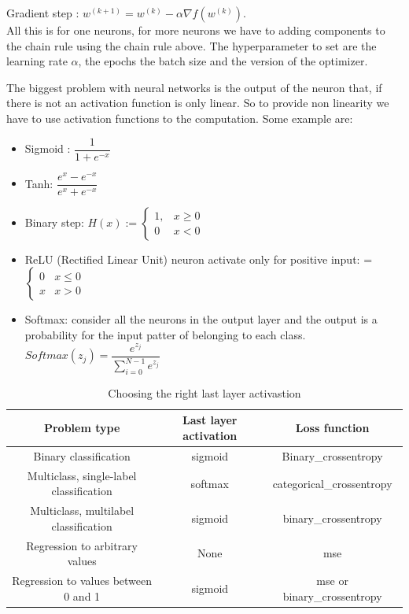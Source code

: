 Gradient step : $ w^{(k+1)} = w^{(k)}  - \alpha \nabla f(w^{(k)})$.\\

 All this is for one neurons, for more neurons we have to adding components to the chain rule using the chain rule above.
 The hyperparameter to set are the learning rate $\alpha$, the epochs the batch size and the version of the optimizer.

 The biggest problem with neural networks is the output of the neuron that, if there is not an activation function is only linear.
 So to provide non linearity we have to use activation functions to the computation. Some example are:
 \begin{itemize}
     \item Sigmoid : $\dfrac{1}{1+ e^{-x}}$
     \item Tanh: $\dfrac{e^{x}- e^{-x}}{e^x + e^{-x}} $
     \item Binary step: $ H(x) := \begin{cases}
                1, & x \ge 0 \\
                0 & x<0
                \end{cases}$
    \item ReLU (Rectified Linear Unit) neuron activate only for positive input: = $\begin{cases}
        0 & x \leq 0 \\
        x & x>0
    \end{cases}$
     \item Softmax: consider all the neurons in the output layer and the output is a probability for the input patter of belonging to each class. $Softmax(z_j) = \dfrac{e^{z_j}}{\sum\limits_{i=0}^{N-1}e^{z_j} }$
 \end{itemize}

 
 \begin{table}[H]
     \centering
     \begin{tabular}{ccc}
         Problem type & Last layer activation & Loss function\\ \hline
         Binary classification & sigmoid & Binary\_crossentropy\\ 
         Multiclass, single-label classification & softmax & categorical\_crossentropy \\ 
         Multiclass, multilabel classification & sigmoid & binary\_crossentropy\\ 
         Regression to arbitrary values & None & mse \\ 
         Regression to values between 0 and 1 & sigmoid & mse or binary\_crossentropy\\ 
     \end{tabular}
     \caption{Choosing the right last layer activastion}
     \label{tab:my_label}
 \end{table}

